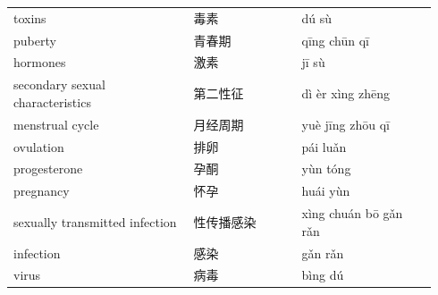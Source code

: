 \documentclass[11pt]{article}
\begin{document}
\begin{longtable}{@{}p{0.40\linewidth}p{0.24\linewidth}p{0.30\linewidth}@{}}
toxins & 毒素 & dú sù \\
puberty & 青春期 & qīng chūn qī \\
hormones & 激素 & jī sù \\
secondary sexual characteristics & 第二性征 & dì èr xìng zhēng \\
menstrual cycle & 月经周期 & yuè jīng zhōu qī \\
ovulation & 排卵 & pái luǎn \\
progesterone & 孕酮 & yùn tóng \\
pregnancy & 怀孕 & huái yùn \\
sexually transmitted infection & 性传播感染 & xìng chuán bō gǎn rǎn \\
infection & 感染 & gǎn rǎn \\
virus & 病毒 & bìng dú \\
\end{longtable}
\end{document}

